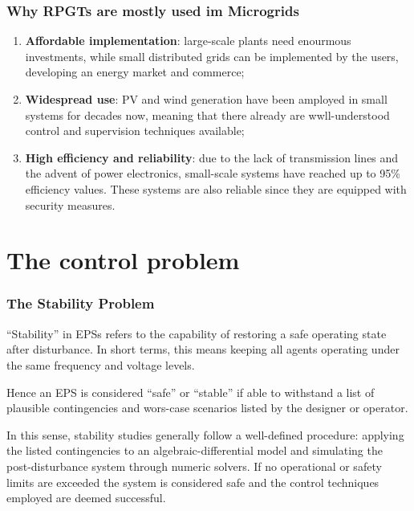 \documentclass[10pt, compress,xcolor={svgnames,dvipsnames,x11names}]{beamer}
\begin{document}
\begin{frame}%
\frametitle{Why RPGTs are mostly used im Microgrids}

\begin{enumerate}[<+->]
	\item \textbf{Affordable implementation}: large-scale plants need enourmous investments, while small distributed grids can be implemented by the users, developing an energy market and commerce;
%
	\item \textbf{Widespread use}: PV and wind generation have been amployed in small systems for decades now, meaning that there already are wwll-understood control and supervision techniques available;
%
	\item \textbf{High efficiency and reliability}: due to the lack of transmission lines and the advent of power electronics, small-scale systems have reached up to 95\% efficiency values. These systems are also reliable since they are equipped with security measures.
\end{enumerate}
	
\end{frame}%

\section{The control problem}%

\begin{frame}%
\frametitle{The Stability Problem}

	``Stability'' in EPSs refers to the capability of restoring a safe operating state after disturbance. In short terms, this means keeping all agents operating under the same frequency and voltage levels.

	Hence an EPS is considered ``safe'' or ``stable'' if able to withstand a list of plausible contingencies and wors-case scenarios listed by the designer or operator.

	In this sense, stability studies generally follow a well-defined procedure: applying the listed contingencies to an algebraic-differential model and simulating the post-disturbance system through numeric solvers. If no operational or safety limits are exceeded the system is considered safe and the control techniques employed are deemed successful.
	
\end{frame}%
\end{document}
